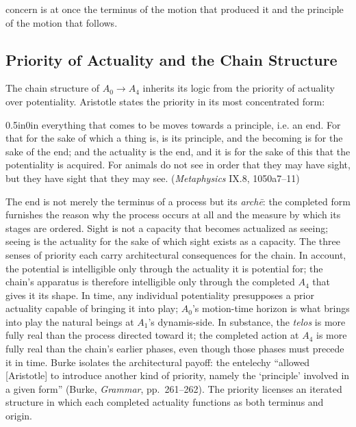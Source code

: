 \documentclass{article}
\begin{document}
concern is at once the terminus of the motion that produced it and the principle of the motion that follows.

\subsection{Priority of Actuality and the Chain Structure}

The chain structure of $A_0 \rightarrow A_4$ inherits its logic from the priority of actuality over potentiality. Aristotle states the priority in its most concentrated form:
\begin{adjustwidth}{0.5in}{0in}
everything that comes to be moves towards a principle, i.e. an end. For that for the sake of which a thing is, is its principle, and the becoming is for the sake of the end; and the actuality is the end, and it is for the sake of this that the potentiality is acquired. For animals do not see in order that they may have sight, but they have sight that they may see. (\textit{Metaphysics} IX.8, 1050a7--11)
\end{adjustwidth}
The end is not merely the terminus of a process but its \textit{archē}: the completed form furnishes the reason why the process occurs at all and the measure by which its stages are ordered. Sight is not a capacity that becomes actualized as seeing; seeing is the actuality for the sake of which sight exists as a capacity. The three senses of priority each carry architectural consequences for the chain. In account, the potential is intelligible only through the actuality it is potential for; the chain's apparatus is therefore intelligible only through the completed $A_4$ that gives it its shape. In time, any individual potentiality presupposes a prior actuality capable of bringing it into play; $A_0$'s motion-time horizon is what brings into play the natural beings at $A_1$'s dynamis-side. In substance, the \textit{telos} is more fully real than the process directed toward it; the completed action at $A_4$ is more fully real than the chain's earlier phases, even though those phases must precede it in time. Burke isolates the architectural payoff: the entelechy ``allowed [Aristotle] to introduce another kind of priority, namely the `principle' involved in a given form'' (Burke, \textit{Grammar}, pp.~261--262). The priority licenses an iterated structure in which each completed actuality functions as both terminus and origin.
\end{document}
